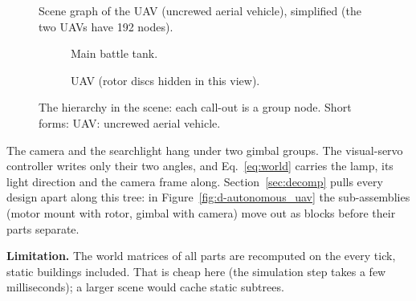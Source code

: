 \begin{figure}[htbp]
\centering
{}
\caption{Scene graph of the UAV (uncrewed aerial vehicle), simplified (the two UAVs have 192 nodes).}
\label{fig:sg}
\end{figure}

\begin{figure}[htbp]
\centering
\begin{subfigure}[t]{0.49\linewidth}\caption{Main battle tank.}\end{subfigure}\hfill
\begin{subfigure}[t]{0.49\linewidth}\caption{UAV (rotor discs hidden in this view).}\end{subfigure}
\caption{The hierarchy in the scene: each call-out is a group node. Short forms: UAV: uncrewed aerial vehicle.}
\label{fig:hier-scene}
\end{figure}

The camera and the searchlight hang under two gimbal groups. The visual-servo controller writes only their two
angles, and Eq.~\eqref{eq:world} carries the lamp, its light direction and the camera frame along. Section~\ref{sec:decomp}
pulls every design apart along this tree: in Figure~\ref{fig:d-autonomous_uav} the sub-assemblies (motor mount with
rotor, gimbal with camera) move out as blocks before their parts separate.

\textbf{Limitation.} The world matrices of all \nLeaves{} parts are recomputed on the  every tick, static
buildings included. That is cheap here (the simulation step takes a few milliseconds); a larger scene would cache static
subtrees.

\clearpage
